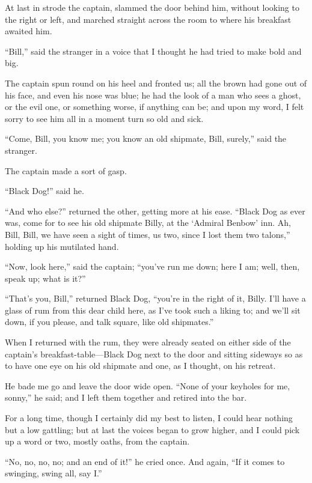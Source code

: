 At last in strode the captain, slammed the door behind him, without looking to the right or left, and marched straight across the room to where his breakfast awaited him.

\enquote{Bill,} said the stranger in a voice that I thought he had tried to make bold and big.

The captain spun round on his heel and fronted us; all the brown had gone out of his face, and even his nose was blue; he had the look of a man who sees a ghost, or the evil one, or something worse, if anything can be; and upon my word, I felt sorry to see him all in a moment turn so old and sick.

\enquote{Come, Bill, you know me; you know an old shipmate, Bill, surely,} said the stranger.

The captain made a sort of gasp.

\enquote{Black Dog!} said he.

\enquote{And who else?} returned the other, getting more at his ease. \enquote{Black Dog as ever was, come for to see his old shipmate Billy, at the \enquote{Admiral Benbow} inn. Ah, Bill, Bill, we have seen a sight of times, us two, since I lost them two talons,} holding up his mutilated hand.

\enquote{Now, look here,} said the captain; \enquote{you’ve run me down; here I am; well, then, speak up; what is it?}

\enquote{That’s you, Bill,} returned Black Dog, \enquote{you’re in the right of it, Billy. I’ll have a glass of rum from this dear child here, as I’ve took such a liking to; and we’ll sit down, if you please, and talk square, like old shipmates.}

When I returned with the rum, they were already seated on either side of the captain’s breakfast-table---Black Dog next to the door and sitting sideways so as to have one eye on his old shipmate and one, as I thought, on his retreat.

He bade me go and leave the door wide open. \enquote{None of your keyholes for me, sonny,} he said; and I left them together and retired into the bar.

For a long time, though I certainly did my best to listen, I could hear nothing but a low gattling; but at last the voices began to grow higher, and I could pick up a word or two, mostly oaths, from the captain.

\enquote{No, no, no, no; and an end of it!} he cried once. And again, \enquote{If it comes to swinging, swing all, say I.}

